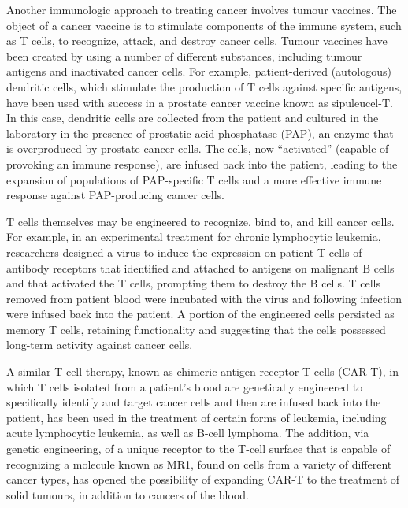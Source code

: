 Another immunologic approach to treating cancer involves tumour vaccines. The object of a cancer vaccine is to stimulate components of the immune system, such as T cells, to recognize, attack, and destroy cancer cells. Tumour vaccines have been created by using a number of different substances, including tumour antigens and inactivated cancer cells. For example, patient-derived (autologous) dendritic cells, which stimulate the production of T cells against specific antigens, have been used with success in a prostate cancer vaccine known as sipuleucel-T. In this case, dendritic cells are collected from the patient and cultured in the laboratory in the presence of prostatic acid phosphatase (PAP), an enzyme that is overproduced by prostate cancer cells. The cells, now “activated” (capable of provoking an immune response), are infused back into the patient, leading to the expansion of populations of PAP-specific T cells and a more effective immune response against PAP-producing cancer cells.

T cells themselves may be engineered to recognize, bind to, and kill cancer cells. For example, in an experimental treatment for chronic lymphocytic leukemia, researchers designed a virus to induce the expression on patient T cells of antibody receptors that identified and attached to antigens on malignant B cells and that activated the T cells, prompting them to destroy the B cells. T cells removed from patient blood were incubated with the virus and following infection were infused back into the patient. A portion of the engineered cells persisted as memory T cells, retaining functionality and suggesting that the cells possessed long-term activity against cancer cells.

A similar T-cell therapy, known as chimeric antigen receptor T-cells (CAR-T), in which T cells isolated from a patient’s blood are genetically engineered to specifically identify and target cancer cells and then are infused back into the patient, has been used in the treatment of certain forms of leukemia, including acute lymphocytic leukemia, as well as B-cell lymphoma. The addition, via genetic engineering, of a unique receptor to the T-cell surface that is capable of recognizing a molecule known as MR1, found on cells from a variety of different cancer types, has opened the possibility of expanding CAR-T to the treatment of solid tumours, in addition to cancers of the blood.

